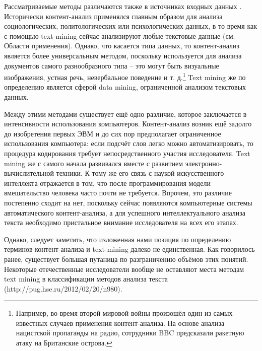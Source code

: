 Рассматриваемые методы различаются также в источниках входных данных \cite[стр. 735]{tm_and_ca}. Исторически контент-анализ применялся главным образом для анализа социологических, политологических или психологических данных, в то время как с помощью text-mining сейчас анализируют любые текстовые данные (см. Области применения). Однако, что касается типа данных, то контент-анализ является более универсальным методом, поскольку используется для анализа документов самого разнообразного типа -- это могут быть визуальные изображения, устная речь, невербальное поведение и т. д.\footnote{Например, во время второй мировой войны произошёл один из самых известных случаев применения контент-анализа. На основе анализа нацистской пропаганды на радио, сотрудники BBC предсказали ракетную атаку на Британские острова.} Text mining же по определению является сферой data mining, ограниченной анализом текстовых данных.

Между этими методами существует ещё одно различие, которое заключается в интенсивности использования компьютеров. Контент-анализ возник ещё задолго до изобретения первых ЭВМ и до сих пор предполагает ограниченное использования компьютера: если подсчёт слов легко можно автоматизировать, то процедура кодирования требует непосредственного участия исследователя. Text mining же с самого начала развивался вместе с развитием электронно-вычислительной техники. К тому же его связь с наукой искусственного интеллекта отражается в том, что после программирования модели вмешательство человека часто почти не требуется. Впрочем, это различие постепенно сходит на нет, поскольку сейчас появляются компьютерные системы автоматического контент-анализа, а для успешного интеллектуального анализа текста необходимо пристальное внимание исследователя на всех его этапах.

Однако, следует заметить, что изложенная нами позиция по определению терминов контент-анализа и text-mining далеко не единственная. Как говорилось ранее, существует большая путаница по разграничению объёмов этих понятий. Некоторые отечественные исследователи вообще не оставляют места методам text mining в классификации методов анализа текста (http://pug.hse.ru/2012/02/20/n980). 
\clearpage